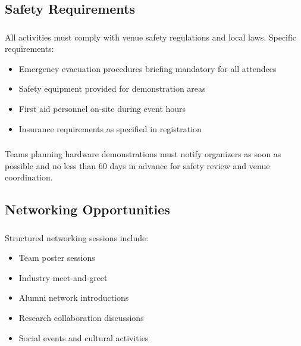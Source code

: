 \subsection{Safety Requirements}

\subsubsection{}
All activities must comply with venue safety regulations and local laws. Specific requirements:
\begin{itemize}[noitemsep]
    \item Emergency evacuation procedures briefing mandatory for all attendees
    \item Safety equipment provided for demonstration areas
    \item First aid personnel on-site during event hours
    \item Insurance requirements as specified in registration
\end{itemize}

\subsubsection{}
Teams planning hardware demonstrations must notify organizers as soon as possible and no less than 60 days in advance for safety review and venue coordination.

\subsection{Networking Opportunities}

\subsubsection{}
Structured networking sessions include:
\begin{itemize}[noitemsep]
    \item Team poster sessions
    \item Industry meet-and-greet
    \item Alumni network introductions
    \item Research collaboration discussions
    \item Social events and cultural activities
\end{itemize}